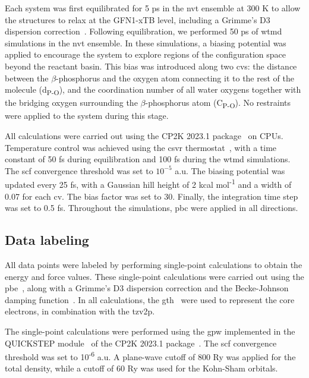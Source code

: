 Each system was first equilibrated for 5 ps in the \ac{nvt} ensemble at 300 K to allow the structures to relax at the GFN1-xTB level, including a Grimme's D3 dispersion correction~\citep{grimmeConsistentAccurateInitio2010}. Following equilibration, we performed 50 ps of \ac{wtmd}~\citep{barducciWellTemperedMetadynamicsSmoothly2008} simulations in the \ac{nvt} ensemble. In these simulations, a biasing potential was applied to encourage the system to explore regions of the configuration space beyond the reactant basin. This bias was introduced along two \acp{cv}: the distance between the $\beta$-phosphorus and the oxygen atom connecting it to the rest of the molecule (d\textsubscript{P-O}), and the coordination number of all water oxygens together with the bridging oxygen surrounding the $\beta$-phosphorus atom (C\textsubscript{P-O}). No restraints were applied to the system during this stage.

All calculations were carried out using the CP2K 2023.1 package~\citep{kuhneCP2KElectronicStructure2020} on CPUs. Temperature control was achieved using the \ac{csvr} thermostat~\citep{bussiCanonicalSamplingVelocity2007}, with a time constant of 50 fs during equilibration and 100 fs during the \ac{wtmd} simulations. The \ac{scf} convergence threshold was set to $10^{-5}$ a.u. The biasing potential was updated every 25 fs, with a Gaussian hill height of 2 kcal mol\textsuperscript{-1} and a width of 0.07 for each \ac{cv}. The bias factor was set to 30. Finally, the integration time step was set to 0.5 fs. Throughout the simulations, \ac{pbc} were applied in all directions.



\subsection{Data labeling}
All data points were labeled by performing single-point calculations to obtain the energy and force values. These single-point calculations were carried out using the \ac{pbe}~\citep{perdewGeneralizedGradientApproximation1996}, along with a Grimme's D3 dispersion correction and the Becke-Johnson damping function~\citep{grimmeConsistentAccurateInitio2010,grimmeEffectDampingFunction2011}. In all calculations, the \ac{gth}~\citep{goedeckerSeparableDualspaceGaussian1996,hartwigsenRelativisticSeparableDualspace1998} were used to represent the core electrons, in combination with the \ac{tzv2p}.

The single-point calculations were performed using the \; \ac{gpw} implemented in the QUICKSTEP module~\citep{vandevondeleQuickstepFastAccurate2005} of the CP2K 2023.1 package~\citep{kuhneCP2KElectronicStructure2020}. The \ac{scf} convergence threshold was set to 10\textsuperscript{-6} a.u. A plane-wave cutoff of 800 Ry was applied for the total density, while a cutoff of 60 Ry was used for the Kohn-Sham orbitals.

